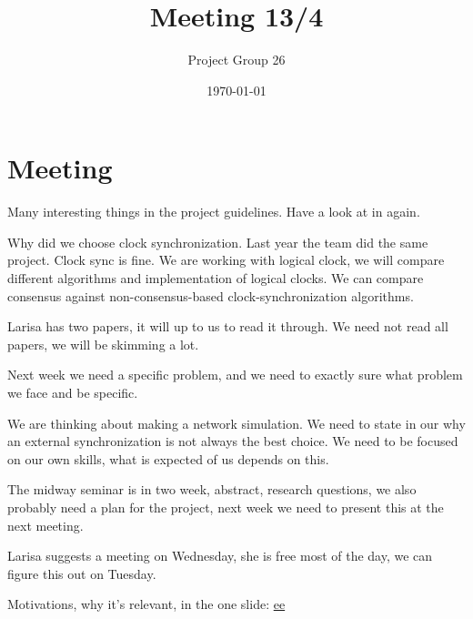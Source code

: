 \documentclass{article}
\title{Meeting 13/4}
\author{Project Group 26}
\date{\today}
\begin{document}
\maketitle

\section{Meeting}

Many interesting things in the project guidelines. Have a look at in again.

Why did we choose clock synchronization. Last year the team did the same project. Clock sync is fine. We are working with logical clock, we will compare different algorithms and implementation of logical clocks. We can compare consensus  against non-consensus-based clock-synchronization algorithms. 

Larisa has two papers, it will up to us to read it through. We need not read all papers, we will be skimming a lot. 

Next week we need a specific problem, and we need to exactly sure what problem we face and be specific.

We are thinking about making a network simulation. We need to state in our why an external synchronization is not always the best choice. We need to be focused on our own skills, what is expected of us depends on this.

The midway seminar is in two week, abstract, research questions, we also probably need a plan for the project, next week we need to present this at the next meeting.

Larisa suggests a meeting on Wednesday, she is free most of the day, we can figure this out on Tuesday.

Motivations, why it's relevant, in the one slide:
\href{https://www.slideshare.net/zbigniew.jerzak/clock-synchronization-in-distributed-systems}{ee}
\end{document}
